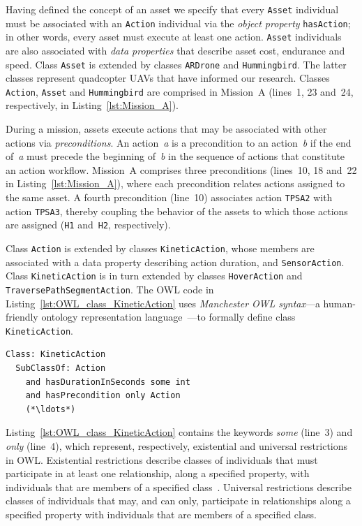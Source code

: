 Having defined the concept of an asset we specify that every \texttt{Asset} individual must be associated with an \texttt{Action} individual via the \emph{object property} \texttt{hasAction}; in other words, every asset must execute at least one action. \texttt{Asset} individuals are also associated with \emph{data properties} that describe asset cost, endurance and speed. Class \texttt{Asset} is extended by classes \texttt{ARDrone} and \texttt{Hummingbird}. The latter classes represent quadcopter UAVs that have informed our research. Classes \texttt{Action}, \texttt{Asset} and \texttt{Hummingbird} are comprised in Mission~A (lines~1, 23 and~24, respectively, in Listing~\ref{lst:Mission_A}).

During a mission, assets execute actions that may be associated with other actions via \emph{preconditions}. An action~\emph{a} is a precondition to an action~\emph{b} if the end of~\emph{a} must precede the beginning of~\emph{b} in the sequence of actions that constitute an action workflow. Mission~A comprises three preconditions (lines~10, 18 and~22 in Listing~\ref{lst:Mission_A}), where each precondition relates actions assigned to the same asset. A fourth precondition (line~10) associates action \texttt{TPSA2} with action \texttt{TPSA3}, thereby coupling the behavior of the assets to which those actions are assigned (\texttt{H1} and~\texttt{H2}, respectively).

Class \texttt{Action} is extended by classes \texttt{KineticAction}, whose members are associated with a data property describing action duration, and \texttt{SensorAction}. Class \texttt{KineticAction} is in turn extended by classes \texttt{HoverAction} and \texttt{TraversePathSegmentAction}. The OWL code in Listing~\ref{lst:OWL_class_KineticAction} uses \emph{Manchester OWL syntax}---a human-friendly ontology representation language~\cite{Horridge_2006}---to formally define class \texttt{KineticAction}.

\begin{lstlisting}[caption={OWL code for class KineticAction},label=lst:OWL_class_KineticAction]
Class: KineticAction
  SubClassOf: Action
    and hasDurationInSeconds some int
    and hasPrecondition only Action
    (*\ldots*)
\end{lstlisting}

Listing~\ref{lst:OWL_class_KineticAction} contains the keywords \emph{some} (line~3) and \emph{only} (line~4), which represent, respectively, existential and universal restrictions in OWL\@. Existential restrictions describe classes of individuals that must participate in at least one relationship, along a specified property, with individuals that are members of a specified class~\cite{Horridge_2011}. Universal restrictions describe classes of individuals that may, and can only, participate in relationships along a specified property with individuals that are members of a specified class.

